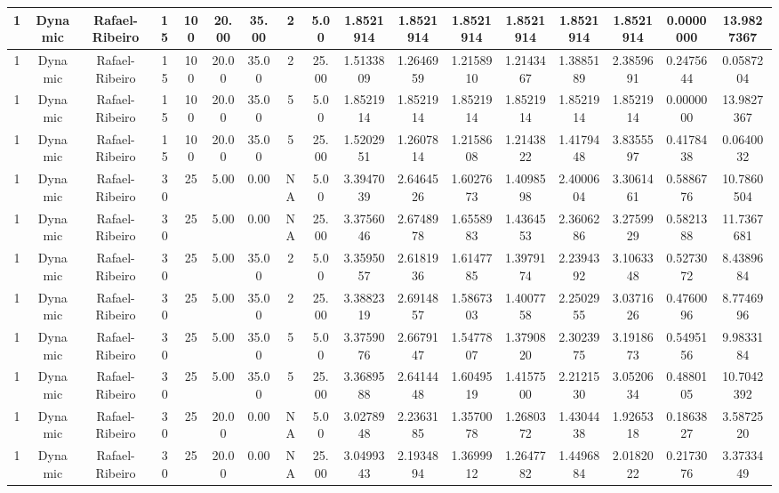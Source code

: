 \documentclass[a4paper]{article}
\begin{document}
\begin{center}
\begin{tabular}{ | c | c | c | c | c | c | c | c | c | c | c | c | c | c | c | c | c | }
		1	&	Dynamic	&	Rafael-Ribeiro	&	15	&	100	&	20.00	&	35.00	&	2	&	5.00	&	1.8521914	&	1.8521914	&	1.8521914	&	1.8521914	&	1.8521914	&	1.8521914	&	0.0000000	&	13.9827367 \\
		\hline
		1	&	Dynamic	&	Rafael-Ribeiro	&	15	&	100	&	20.00	&	35.00	&	2	&	25.00	&	1.5133809	&	1.2646959	&	1.2158910	&	1.2143467	&	1.3885189	&	2.3859691	&	0.2475644	&	0.0587204 \\
		\hline
		1	&	Dynamic	&	Rafael-Ribeiro	&	15	&	100	&	20.00	&	35.00	&	5	&	5.00	&	1.8521914	&	1.8521914	&	1.8521914	&	1.8521914	&	1.8521914	&	1.8521914	&	0.0000000	&	13.9827367 \\
		\hline
		1	&	Dynamic	&	Rafael-Ribeiro	&	15	&	100	&	20.00	&	35.00	&	5	&	25.00	&	1.5202951	&	1.2607814	&	1.2158608	&	1.2143822	&	1.4179448	&	3.8355597	&	0.4178438	&	0.0640032 \\
		\hline
		1	&	Dynamic	&	Rafael-Ribeiro	&	30	&	25	&	5.00	&	0.00	&	NA	&	5.00	&	3.3947039	&	2.6464526	&	1.6027673	&	1.4098598	&	2.4000604	&	3.3061461	&	0.5886776	&	10.7860504 \\
		\hline
		1	&	Dynamic	&	Rafael-Ribeiro	&	30	&	25	&	5.00	&	0.00	&	NA	&	25.00	&	3.3756046	&	2.6748978	&	1.6558983	&	1.4364553	&	2.3606286	&	3.2759929	&	0.5821388	&	11.7367681 \\
		\hline
		1	&	Dynamic	&	Rafael-Ribeiro	&	30	&	25	&	5.00	&	35.00	&	2	&	5.00	&	3.3595057	&	2.6181936	&	1.6147785	&	1.3979174	&	2.2394392	&	3.1063348	&	0.5273072	&	8.4389684 \\
		\hline
		1	&	Dynamic	&	Rafael-Ribeiro	&	30	&	25	&	5.00	&	35.00	&	2	&	25.00	&	3.3882319	&	2.6914857	&	1.5867303	&	1.4007758	&	2.2502955	&	3.0371626	&	0.4760096	&	8.7746996 \\
		\hline
		1	&	Dynamic	&	Rafael-Ribeiro	&	30	&	25	&	5.00	&	35.00	&	5	&	5.00	&	3.3759076	&	2.6679147	&	1.5477807	&	1.3790820	&	2.3023975	&	3.1918673	&	0.5495156	&	9.9833184 \\
		\hline
		1	&	Dynamic	&	Rafael-Ribeiro	&	30	&	25	&	5.00	&	35.00	&	5	&	25.00	&	3.3689588	&	2.6414448	&	1.6049519	&	1.4157500	&	2.2121530	&	3.0520634	&	0.4880105	&	10.7042392 \\
		\hline
		1	&	Dynamic	&	Rafael-Ribeiro	&	30	&	25	&	20.00	&	0.00	&	NA	&	5.00	&	3.0278948	&	2.2363185	&	1.3570078	&	1.2680372	&	1.4304438	&	1.9265318	&	0.1863827	&	3.5872520 \\
		\hline
		1	&	Dynamic	&	Rafael-Ribeiro	&	30	&	25	&	20.00	&	0.00	&	NA	&	25.00	&	3.0499343	&	2.1934894	&	1.3699912	&	1.2647782	&	1.4496884	&	2.0182022	&	0.2173076	&	3.3733449 \\
		\hline

\end{tabular}
\end{center}
\end{document}
